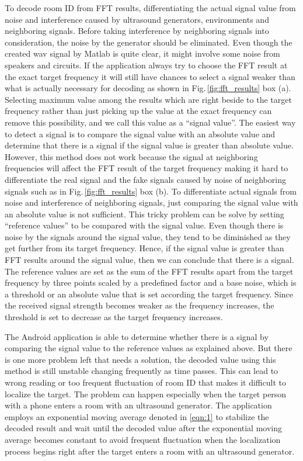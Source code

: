 To decode room ID from FFT results, differentiating the actual signal value from noise and interference caused by ultrasound generators, environments and neighboring signals. Before taking interference by neighboring signals into consideration, the noise by the generator should be eliminated. Even though the created wav signal by Matlab is quite clear, it might involve some noise from speakers and circuits. If the application always try to choose the FFT result at the exact target frequency it will still have chances to select a signal weaker than what is actually necessary for decoding as shown in Fig.\,\ref{fig:fft_results} box (a). Selecting maximum value among the results which are right beside to the target frequency rather than just picking up the value at the exact frequency can remove this possibility, and we call this value as a “signal value”. The easiest way to detect a signal is to compare the signal value with an absolute value and determine that there is a signal if the signal value is greater than absolute value. However, this method does not work because the signal at neighboring frequencies will affect the FFT result of the target frequency making it hard to differentiate the real signal and the fake signals caused by noise of neighboring signals such as in Fig.\,\ref{fig:fft_results} box (b). To differentiate actual signals from noise and interference of neighboring signals, just comparing the signal value with an absolute value is not sufficient. This tricky problem can be solve by setting “reference values” to be compared with the signal value. Even though there is noise by the signals around the signal value, they tend to be diminished as they get further from its target frequency. Hence, if the signal value is greater than FFT results around the signal value, then we can conclude that there is a signal. The reference values are set as the sum of the FFT results apart from the target frequency by three points scaled by a predefined factor and a base noise, which is a threshold or an absolute value that is set according the target frequency. Since the received signal strength becomes weaker as the frequency increases, the threshold is set to decrease as the target frequency increases.

The Android application is able to determine whether there is a signal by comparing the signal value to the reference values as explained above. But there is one more problem left that needs a solution, the decoded value using this method is still unstable changing frequently as time passes. This can lead to wrong reading or too frequent fluctuation of room ID that makes it difficult to localize the target.  The problem can happen especially when the target person with a phone enters a room with an ultrasound generator. The application employs an exponential moving average denoted in \ref{eqn:1} to stabilize the decoded result and wait until the decoded value after the exponential moving average becomes constant to avoid frequent fluctuation when the localization process begins right after the target enters a room with an ultrasound generator.

